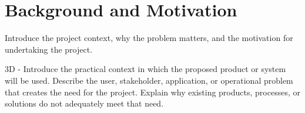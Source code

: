 \section{Background and Motivation}
Introduce the project context, why the problem matters, 
and the motivation for undertaking the project.

3D - Introduce the practical context in which the proposed product or system will be used. 
Describe the user, stakeholder, application, or operational problem that creates the need 
for the project. Explain why existing products, processes, or solutions do not adequately meet that need.

